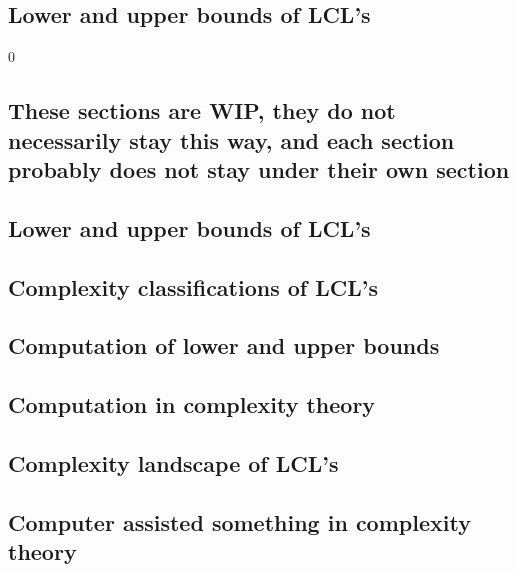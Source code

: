 \subsection{Lower and upper bounds of LCL's}


0

\subsection{\color{red}These sections are WIP, they do not necessarily stay this way, and each section probably does not stay under their own section}
\subsection{Lower and upper bounds of LCL's}
\subsection{Complexity classifications of LCL's}
\subsection{Computation of lower and upper bounds}
\subsection{Computation in complexity theory}
\subsection{Complexity landscape of LCL's}
\subsection{Computer assisted something in complexity theory}
